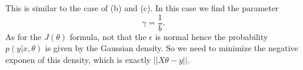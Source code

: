 \begin{answer}
This is similar to the case of (b) and (c). In this case we find the parameter
$$\gamma = \frac 1b.$$
As for the $J(\theta)$ formula, not that the $\epsilon$ is normal hence the probability
$p(y|x, \theta)$ is given by the Gaussian density. So we need to minimize the negative exponen
of this density, which is exactly $||X\theta - y||.$

\end{answer}

